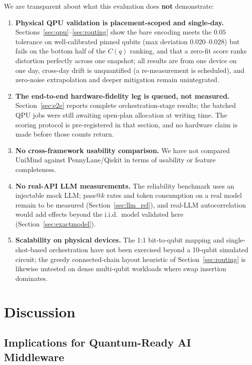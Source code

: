 ﻿\documentclass[12pt,a4paper]{article}
\begin{document}
We are transparent about what this evaluation does \textbf{not} demonstrate:

\begin{enumerate}[leftmargin=2em]
    \item \textbf{Physical QPU validation is placement-scoped and single-day.} Sections~\ref{sec:qpu}--\ref{sec:routing} show the bare encoding meets the $0.05$ tolerance on well-calibrated pinned qubits (max deviation $0.020$--$0.028$) but fails on the bottom half of the $C(q)$ ranking, and that a zero-fit score ranks distortion perfectly across one snapshot; all results are from one device on one day, cross-day drift is unquantified (a re-measurement is scheduled), and zero-noise extrapolation and deeper mitigation remain unintegrated.
    \item \textbf{The end-to-end hardware-fidelity leg is queued, not measured.} Section~\ref{sec:e2e} reports complete orchestration-stage results; the batched QPU jobs were still awaiting open-plan allocation at writing time. The scoring protocol is pre-registered in that section, and no hardware claim is made before those counts return.
    \item \textbf{No cross-framework usability comparison.} We have not compared UniMind against PennyLane/Qiskit in terms of usability or feature completeness.
    \item \textbf{No real-API LLM measurements.} The reliability benchmark uses an injectable mock LLM; pass@$k$ rates and token consumption on a real model remain to be measured (Section~\ref{sec:llm_rel}), and real-LLM autocorrelation would add effects beyond the i.i.d.\ model validated here (Section~\ref{sec:exactmodel}).
    \item \textbf{Scalability on physical devices.} The 1:1 bit-to-qubit mapping and single-shot-based orchestration have not been exercised beyond a 10-qubit simulated circuit; the greedy connected-chain layout heuristic of Section~\ref{sec:routing} is likewise untested on dense multi-qubit workloads where swap insertion dominates.
\end{enumerate}


\section{Discussion}\label{sec:discussion}

\subsection{Implications for Quantum-Ready AI Middleware}
\end{document}

